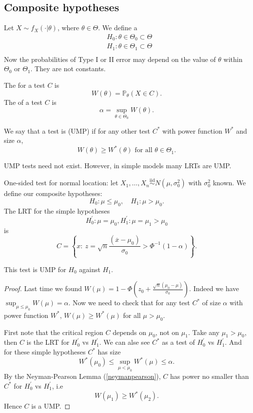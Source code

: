 \documentclass[egregdoesnotlikesansseriftitles,a4paper]{scrartcl}
\begin{document}
\subsection{Composite hypotheses}
Let $X \sim f_{X}(\cdot |\theta)$, where $\theta \in \Theta$. We define a  
\begin{align*}
     &H_0: \theta\in \Theta_{0} \subset \Theta\\
     &H_1: \theta\in \Theta_{1} \subset \Theta\\
\end{align*}
Now the probabilities of Type I or II error may depend on the value of $\theta$ within $\Theta_0 $ or $\Theta_1 $. They are not constants.
\begin{definition*}
      The  for a test $C$ is \[
      W (\theta)=\mathbb{P}_{\theta}(X \in C)
      .\] The  of a test $C$ is \[
      \alpha= \sup_{\theta \in \Theta_0 } W (\theta)
      .\]
\end{definition*}
We say that a test is  (UMP) if for any other test $C^* $ with power function $W^*$ and size $\alpha$, \[
W (\theta) \geq W^* (\theta) \text{ for all } \theta \in \Theta_{1}
.\]\begin{remark}
      UMP tests need not exist. However, in simple models many LRTs are UMP.
\end{remark}
\begin{example*}
      One-sided test for normal location: let $X_1 ,\ldots,X_n \overset{\operatorname{iid}}{\sim} N (\mu, \sigma_0^2)$ with $\sigma_0^2$ known. We define our composite hypotheses: \[
      H_0 : \mu \leq \mu_0 , \quad H_1 : \mu >\mu_0 
      .\] The LRT for the simple hypotheses \[
      H_0 ^\prime : \mu=\mu_0 , H_1 ^\prime : \mu=\mu_1 >\mu_0 
      \] is \[
      C=\left\{x:\ z =\sqrt{n} \frac{(\overline{x}-\mu_0 )}{\sigma_0 }> \Phi^{-1}(1-\alpha)\right\}
      .\]
      \begin{claim}
           This test is UMP for $H_0 $ against $H_1 $.
      \end{claim}
      \begin{proof}
          Last time we found $W (\mu)=1- \Phi (z_0 + \frac{\sqrt{n} (\mu_0 -\mu)}{\sigma_0 })$. Indeed we have $\sup _{\mu \leq \mu_0 }W (\mu)=\alpha$. Now we need to check that for any test $C^*$ of size $\alpha$ with power function $W^* $, $W (\mu)\geq W^* (\mu)$ for all $\mu > \mu_0 $.

          First note that the critical region $C$ depends on $\mu_0 $, not on $\mu_1 $. Take any $\mu_1 > \mu_0 $, then $C $ is the LRT for $H_0 ^\prime$ vs $H_1 ^\prime $. We can alse see $C^* $ as a test of $H_0 ^\prime  $ vs $H_1 ^\prime $. And for these simple hypotheses $C^* $ has size \[
          W^* (\mu_0 ) \leq \sup_{\mu < \mu_0 }W^* (\mu) \leq  \alpha
          .\] By the Neyman-Pearson Lemma (\ref{neymanpearson}), $C$ has power no smaller than $C^* $ for $H_0 ^\prime  $ vs $H_1 ^\prime $, i.e \[
          W (\mu_1 ) \geq W^* (\mu_2 )
          .\] Hence $C $ is a UMP.
      \end{proof}
\end{example*}
\end{document}
